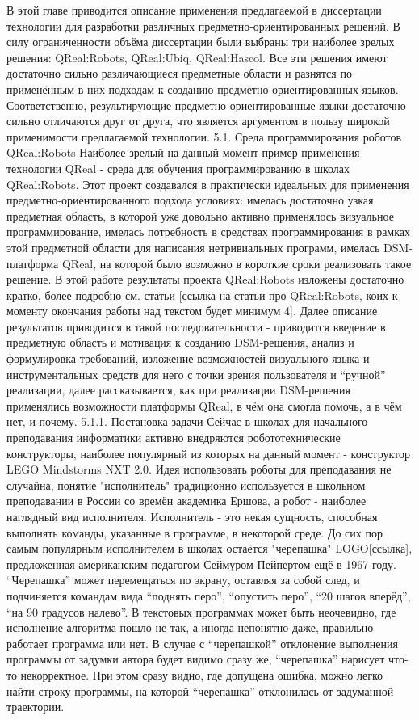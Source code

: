 	В этой главе приводится описание применения предлагаемой в диссертации технологии для разработки различных предметно-ориентированных решений. В силу ограниченности объёма диссертации были выбраны три наиболее зрелых решения: QReal:Robots, QReal:Ubiq, QReal:Hascol. Все эти решения имеют достаточно сильно различающиеся предметные области и разнятся по применённым в них подходам к созданию предметно-ориентированных языков. Соответственно, результирующие предметно-ориентированные языки достаточно сильно отличаются друг от друга, что является аргументом в пользу широкой применимости предлагаемой технологии.
5.1. Среда программирования роботов QReal:Robots
	Наиболее зрелый на данный момент пример применения технологии QReal - среда для обучения программированию в школах QReal:Robots. Этот проект создавался в практически идеальных для применения предметно-ориентированного подхода условиях: имелась достаточно узкая предметная область, в которой уже довольно активно применялось визуальное программирование, имелась потребность в средствах программирования в рамках этой предметной области для написания нетривиальных программ, имелась DSM-платформа QReal, на которой было возможно в короткие сроки реализовать такое решение. В этой работе результаты проекта QReal:Robots изложены достаточно кратко, более подробно см. статьи [ссылка на статьи про QReal:Robots, коих к моменту окончания работы над текстом будет минимум 4]. Далее описание результатов приводится в такой последовательности - приводится введение в предметную область и мотивация к созданию DSM-решения, анализ и формулировка требований, изложение возможностей визуального языка и инструментальных средств для него с точки зрения пользователя и “ручной” реализации, далее рассказывается, как при реализации DSM-решения применялись возможности платформы QReal, в чём она смогла помочь, а в чём нет, и почему.
5.1.1. Постановка задачи
	Сейчас в школах для начального преподавания информатики активно внедряются робототехнические конструкторы, наиболее популярный из которых на данный момент - конструктор LEGO Mindstorms NXT 2.0. Идея использовать роботы для преподавания не случайна, понятие "исполнитель" традиционно используется в школьном преподавании в России со времён академика Ершова, а робот - наиболее наглядный вид исполнителя. Исполнитель - это некая сущность, способная выполнять команды, указанные в программе, в некоторой среде. До сих пор самым популярным исполнителем в школах остаётся "черепашка" LOGO[ссылка], предложенная американским педагогом Сеймуром Пейпертом ещё в 1967 году. “Черепашка” может перемещаться по экрану, оставляя за собой след, и подчиняется командам вида “поднять перо”, “опустить перо”, “20 шагов вперёд”, “на 90 градусов налево”. В текстовых программах может быть неочевидно, где исполнение алгоритма пошло не так, а иногда непонятно даже, правильно работает программа или нет. В случае с “черепашкой” отклонение выполнения программы от задумки автора будет видимо сразу же, “черепашка” нарисует что-то некорректное. При этом сразу видно, где допущена ошибка, можно легко найти строку программы, на которой “черепашка” отклонилась от задуманной траектории.
